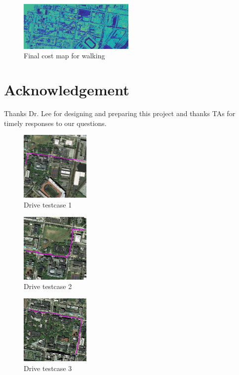 \documentclass[letterpaper,twocolumn,10pt]{article}
\begin{document}
\begin{figure}[h]
    \centering
    \includegraphics[width=0.5\textwidth]{results/cost_walk.jpg}
    \caption{Final cost map for walking}
\end{figure}


\section*{Acknowledgement}
Thanks Dr. Lee for designing and preparing this project and thanks TAs for timely responses to our questions.

{\footnotesize 
}



\begin{figure}[h]
    \centering
    \includegraphics[width=0.3\textwidth]{results/test_drive1.jpg}
    \caption{Drive testcase 1}
\end{figure}

\begin{figure}[h]
    \centering
    \includegraphics[width=0.3\textwidth]{results/test_drive2.jpg}
    \caption{Drive testcase 2}
\end{figure}

\begin{figure}[h]
    \centering
    \includegraphics[width=0.3\textwidth]{results/test_drive3.jpg}
    \caption{Drive testcase 3}
\end{figure}
\end{document}
